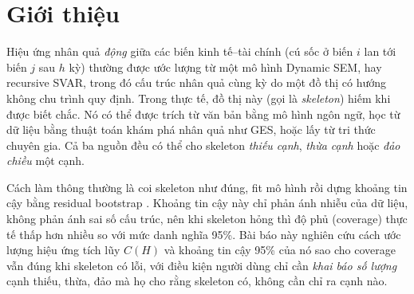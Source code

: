 \section{Giới thiệu}\label{sec:gioi-thieu}

Hiệu ứng nhân quả \emph{động} giữa các biến kinh tế--tài chính (cú sốc ở biến $i$ lan tới biến $j$ sau $h$ kỳ) thường được ước lượng từ một mô hình Dynamic SEM, hay recursive SVAR, trong đó cấu trúc nhân quả cùng kỳ do một đồ thị có hướng không chu trình quy định. Trong thực tế, đồ thị này (gọi là \emph{skeleton}) hiếm khi được biết chắc. Nó có thể được trích từ văn bản bằng mô hình ngôn ngữ, học từ dữ liệu bằng thuật toán khám phá nhân quả như GES, hoặc lấy từ tri thức chuyên gia. Cả ba nguồn đều có thể cho skeleton \emph{thiếu cạnh}, \emph{thừa cạnh} hoặc \emph{đảo chiều} một cạnh.

Cách làm thông thường là coi skeleton như đúng, fit mô hình rồi dựng khoảng tin cậy bằng residual bootstrap \citep{kilian1998small}. Khoảng tin cậy này chỉ phản ánh nhiễu của dữ liệu, không phản ánh sai số cấu trúc, nên khi skeleton hỏng thì độ phủ (coverage) thực tế thấp hơn nhiều so với mức danh nghĩa 95\%. Bài báo này nghiên cứu cách ước lượng hiệu ứng tích lũy $C(H)$ và khoảng tin cậy 95\% của nó sao cho coverage vẫn đúng khi skeleton có lỗi, với điều kiện người dùng chỉ cần \emph{khai báo số lượng} cạnh thiếu, thừa, đảo mà họ cho rằng skeleton có, không cần chỉ ra cạnh nào.

